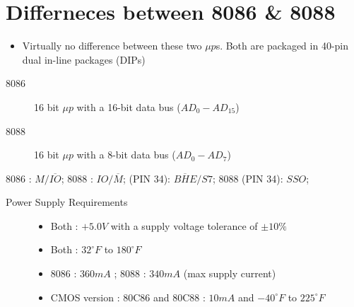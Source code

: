 \section{Differneces between 8086 \& 8088}
\begin{itemize}
  \item Virtually no difference between these two $\mu p$s. Both are packaged in 40-pin dual in-line packages (DIPs)
\end{itemize}
\begin{description}
  \item[8086] 16 bit $\mu p$ with a 16-bit data bus ($AD_0 - AD_{15}$)
  \item[8088] 16 bit $\mu p$ with a 8-bit data bus ($AD_0 - AD_7$)
\end{description}
8086 : $M/\overline{IO}$; 8088 : $IO/\overline{M}$; (PIN 34): $\overline{BHE}/S7$; 8088 (PIN 34): $SSO$;\newline
\begin{description}
  \item[Power Supply Requirements]
  \begin{itemize}
    \item Both : $+5.0V$ with a supply voltage tolerance of $\pm 10\%$
    \item Both : $32^\circ F$ to $180^\circ F$
    \item 8086 : $360 mA$ ; 8088 : $340 mA$ (max supply current)
    \item CMOS version : 80C86 and 80C88 : $10 mA$ and $-40^\circ F$ to $225^\circ F$
  \end{itemize}
\end{description}
\newpage
